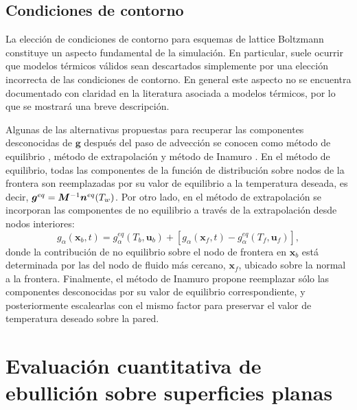 \subsection{Condiciones de contorno}

La elecci\'on de condiciones de contorno para esquemas de lattice Boltzmann constituye un aspecto fundamental de la simulaci\'on. En particular, suele ocurrir que modelos t\'ermicos v\'alidos sean descartados simplemente por una elecci\'on incorrecta de las condiciones de contorno. En general este aspecto no se encuentra documentado con claridad en la literatura asociada a modelos t\'ermicos, por lo que se mostrar\'a una breve descripci\'on.

Algunas de las alternativas propuestas para recuperar las componentes desconocidas de $\bm{g}$ despu\'es del paso de advecci\'on se conocen como m\'etodo de equilibrio \cite{kruger_lattice_2017}, m\'etodo de extrapolaci\'on \cite{guo_extrapolation_2002} y m\'etodo de Inamuro \cite{inamuro_lattice_2002}. En el m\'etodo de equilibrio, todas las componentes de la funci\'on de distribuci\'on sobre nodos de la frontera son reemplazadas por su valor de equilibrio a la temperatura deseada, es decir, $\bm{g}^{eq} = \bm{M}^{-1}\bm{n}^{eq}(T_w)$.  Por otro lado, en el m\'etodo de extrapolaci\'on se incorporan las componentes de no equilibrio a trav\'es de la extrapolaci\'on desde nodos interiores:
\begin{equation}
	g_{\alpha}(\bm{x}_b,t) = g_{\alpha}^{eq}(T_b, \bm{u}_b) + \left[ g_{\alpha}(\bm{x}_f,t) - g_{\alpha}^{eq}(T_f, \bm{u}_f)\right],
\end{equation}
donde la contribuci\'on de no equilibrio sobre el nodo de frontera en $\bm{x}_b$ est\'a determinada por las del nodo de fluido m\'as cercano, $\bm{x}_f$, ubicado sobre la normal a la frontera. Finalmente, el m\'etodo de Inamuro propone reemplazar s\'olo las componentes desconocidas por su valor de equilibrio correspondiente, y posteriormente escalearlas con el mismo factor para preservar el valor de temperatura deseado sobre la pared.







\section{Evaluaci\'on cuantitativa de ebullici\'on sobre superficies planas}

